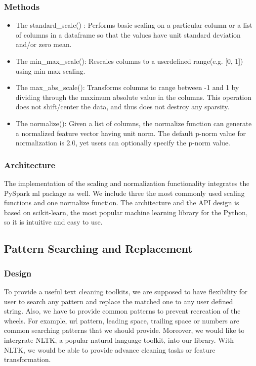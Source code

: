 \documentclass[sigconf]{acmart}
\begin{document}
\subsubsection{Methods}
\begin{itemize}
	\item{The standard\_scale()} : Performs basic scaling on a particular column or a list of columns in a dataframe so that the values have unit standard deviation and/or zero mean. 
	\item{The min\_max\_scale()}: Rescales columns to a user\-defined range(e.g. [0, 1]) using min max scaling.
	\item{The max\_abs\_scale()}: Transforms columns to range between -1 and 1 by dividing through the maximum absolute value in the columns. This operation does not shift/center the data, and thus does not destroy any sparsity. 
	\item{The normalize()}: Given a list of columns, the normalize function can generate a normalized feature vector having unit norm. The default p-norm value for normalization is 2.0, yet users can optionally specify the p-norm value.
\end{itemize}

\subsubsection{Architecture}
The implementation of the scaling and normalization functionality integrates the PySpark ml package as well. We include three the most commonly used scaling functions and one normalize function. The architecture and the API design is based on scikit-learn, the most popular machine learning library for the Python, so it is intuitive and easy to use. 

\subsection{Pattern Searching and Replacement}
\subsubsection{Design} 
To provide a useful text cleaning toolkits, we are supposed to have flexibility for user to search any pattern and replace the matched one to any user defined string. Also, we have to provide common patterns to prevent recreation of the wheels. For example, url pattern, leading space, trailing space or numbers are common searching patterns that we should provide. Moreover, we would like to intergrate NLTK\cite{nltk}, a popular natural language toolkit, into our library. With NLTK, we would be able to provide advance cleaning tasks or feature transformation.
\end{document}
